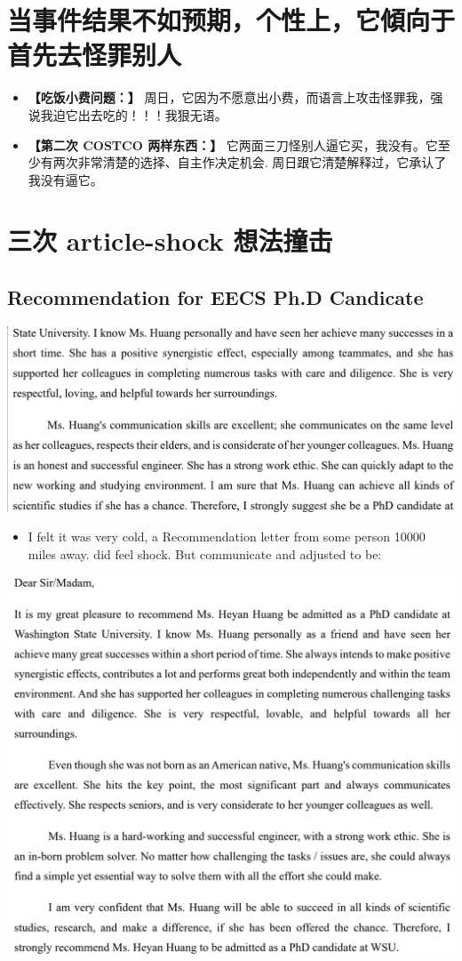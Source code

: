 \documentclass[9pt, b5paper]{article}
\begin{document}
\section{当事件结果不如预期，个性上，它傾向于首先去怪罪别人}
\label{sec-5}
\begin{itemize}
\item \textbf{【吃饭小费问题：】} 周日，它因为不愿意出小费，而语言上攻击怪罪我，强说我迫它出去吃的！！！我狠无语。
\item \textbf{【第二次 COSTCO 两样东西：】} 它两面三刀怪别人逼它买，我没有。它至少有两次非常清楚的选择、自主作决定机会. 周日跟它清楚解释过，它承认了我没有逼它。
\end{itemize}

\section{三次 article-shock 想法撞击}
\label{sec-6}
\subsection{Recommendation for EECS Ph.D Candicate}
\label{sec-6-1}

\includegraphics[width=.9\linewidth]{./pic/readme2_20230329_114352.png}
\begin{itemize}
\item I felt it was very cold, a Recommendation letter from some person 10000 miles away. did feel shock. But communicate and adjusted to be:
\end{itemize}

\includegraphics[width=.9\linewidth]{./pic/readme2_20230329_092732.png}
\end{document}
